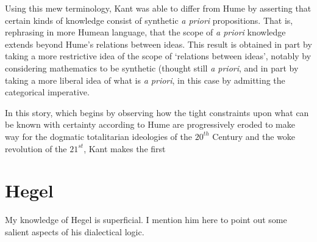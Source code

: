 \documentclass[10pt,titlepage]{article}
\begin{document}
Using this mew terminology, Kant was able to differ from Hume by asserting that certain kinds of knowledge consist of synthetic \emph{a priori} propositions.
That is, rephrasing in more Humean language, that the scope of \emph{a priori} knowledge extends beyond Hume's relations between ideas.
This result is obtained in part by taking a more restrictive idea of the scope of `relations between ideas', notably by considering mathematics to be synthetic (thought still \emph{a priori}, and in part by taking a more liberal idea of what is \emph{a priori}, in this case by admitting the categorical imperative.

In this story, which begins by observing how the tight constraints upon what can be known with certainty according to Hume are progressively eroded to make way for the dogmatic totalitarian ideologies of the $20^{th}$ Century and the woke revolution of the $21^{st}$, Kant makes the first 

\section{Hegel}

My knowledge of Hegel is superficial.
I mention him here to point out some salient aspects of his dialectical logic.



{}








\end{document}
